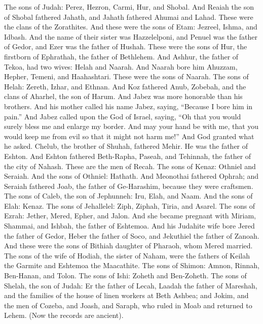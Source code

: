 \begin{biblechapter} %
 The sons of Judah: Perez, Hezron, Carmi, Hur, and Shobal.
\verse And Reaiah the son of Shobal fathered Jahath, and Jahath fathered Ahumai and Lahad. These were the clans of the Zorathites.
\verse And these were the sons of Etam: Jezreel, Ishma, and Idbash. And the name of their sister was Hazzelelponi,
\verse and Penuel was the father of Gedor, and Ezer was the father of Hushah. These were the sons of Hur, the firstborn of Ephrathah, the father of Bethlehem.
\verse And Ashhur, the father of Tekoa, had two wives: Helah and Naarah.
\verse And Naarah bore him Ahuzzam, Hepher, Temeni, and Haahashtari. These were the sons of Naarah.
\verse The sons of Helah: Zereth, Izhar, and Ethnan.
\verse And Koz fathered Anub, Zobebah, and the clans of Aharhel, the son of Harum.
\verse And Jabez was more honorable than his brothers. And his mother called his name Jabez, saying, “Because I bore him in pain.”
\verse And Jabez called upon the God of Israel, saying, “Oh that you would surely bless me and enlarge my border. And may your hand be with me, that you would keep me from evil so that it might not harm me!” And God granted what he asked.
\verse Chelub, the brother of Shuhah, fathered Mehir. He was the father of Eshton.
\verse And Eshton fathered Beth-Rapha, Paseah, and Tehinnah, the father of the city of Nahash. These are the men of Recah.
\verse The sons of Kenaz: Othniel and Seraiah. And the sons of Othniel: Hathath.
\verse And Meonothai fathered Ophrah; and Seraiah fathered Joab, the father of Ge-Harashim, because they were craftsmen.
\verse The sons of Caleb, the son of Jephunneh: Iru, Elah, and Naam. And the sons of Elah: Kenaz.
\verse The sons of Jehallelel: Ziph, Ziphah, Tiria, and Asarel.
\verse The sons of Ezrah: Jether, Mered, Epher, and Jalon. And she became pregnant with Miriam, Shammai, and Ishbah, the father of Eshtemoa.
\verse And his Judahite wife bore Jered the father of Gedor, Heber the father of Soco, and Jekuthiel the father of Zanoah. And these were the sons of Bithiah daughter of Pharaoh, whom Mered married.
\verse The sons of the wife of Hodiah, the sister of Naham, were the fathers of Keilah the Garmite and Eshtemoa the Maacathite.
\verse The sons of Shimon: Amnon, Rinnah, Ben-Hanan, and Tolon. The sons of Ishi: Zoheth and Ben-Zoheth.
\verse The sons of Shelah, the son of Judah: Er the father of Lecah, Laadah the father of Mareshah, and the families of the house of linen workers at Beth Ashbea;
\verse and Jokim, and the men of Cozeba, and Joash, and Saraph, who ruled in Moab and returned to Lehem. (Now the records are ancient).

\end{biblechapter}
